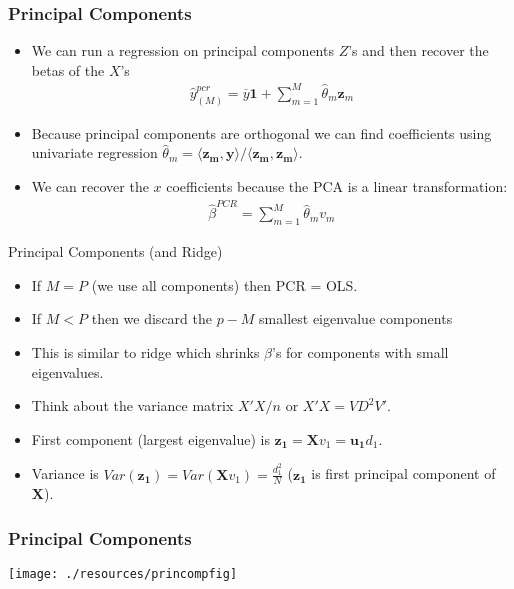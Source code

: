 \documentclass[xcolor=pdftex,dvipsnames,table,mathserif,aspectratio=169]{beamer}
\begin{document}
\begin{frame}
\frametitle{Principal Components}
\begin{itemize}
\item We can run a regression on principal components $Z$'s and then recover the betas of the $X$'s
\begin{eqnarray*}
\hat{y}_{(M)}^{pcr} = \overline{y} \mathbf{1} + \sum_{m=1}^M \hat{\theta}_m \mathbf{z}_m
\end{eqnarray*}
\item Because principal components are orthogonal we can find coefficients using univariate regression $\hat{\theta}_m = \langle \mathbf{z_m} , \mathbf{y} \rangle / \langle \mathbf{z_m} , \mathbf{z_m} \rangle$.
\item We can recover the $x$ coefficients because the PCA is a linear transformation:
\begin{eqnarray*}
\hat{\beta}^{PCR} = \sum_{m=1}^M \hat{\theta}_m v_m
\end{eqnarray*}
\end{itemize}
\end{frame}

\begin{frame}{Principal Components (and Ridge)}
\begin{itemize}
\item If $M=P$ (we use all components) then PCR = OLS.
\item If $M < P$ then we discard the $p-M$ smallest eigenvalue components
\item This is similar to ridge which shrinks $\beta$'s for components with small eigenvalues.
\item Think about the variance matrix $X'X/n$ or $X' X = V D^2 V'$.
\item First component (largest eigenvalue) is $\mathbf{z_1} = \mathbf{X} v_1 = \mathbf{u_1} d_1$.
\item Variance is $Var(\mathbf{z_1}) = Var (\mathbf{X} v_1) = \frac{d_1^2}{N}$ ($\mathbf{z_1}$ is first principal component of $\mathbf{X}$).
\end{itemize}
\end{frame}



\begin{frame}
\frametitle{Principal Components}
\begin{center}
\texttt{[image: ./resources/princompfig]}
\end{center}
\end{frame}
\end{document}
